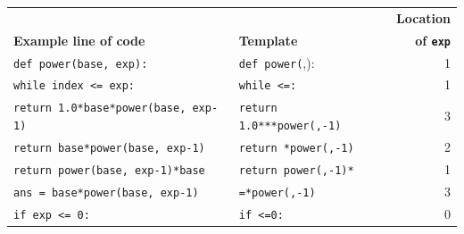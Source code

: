 \begin{table}
\centering
\begin{tabular}{l l r}
 &  & {\bf Location} \\
{\bf Example line of code} & {\bf Template} & {\bf of \texttt{exp}} \\
\hline
\footnotesize{\texttt{def power(base, exp):}} & \footnotesize{\texttt{def power(\underline{\hspace{1em}}},\underline{\hspace{1em}}):} & 1 \\
\footnotesize{\texttt{while index <= exp:}} & \footnotesize{\texttt{while \underline{\hspace{1em}}<=\underline{\hspace{1em}}:}} & 1 \\
\footnotesize{\texttt{return 1.0*base*power(base, exp-1)}} & \footnotesize{\texttt{return 1.0*\underline{\hspace{1em}}*\underline{\hspace{1em}}*power(\underline{\hspace{1em}},\underline{\hspace{1em}}-1)}} & 3 \\
\footnotesize{\texttt{return base*power(base, exp-1)}} & \footnotesize{\texttt{return \underline{\hspace{1em}}*power(\underline{\hspace{1em}},\underline{\hspace{1em}}-1)}} & 2 \\
\footnotesize{\texttt{return power(base, exp-1)*base}} & \footnotesize{\texttt{return power(\underline{\hspace{1em}},\underline{\hspace{1em}}-1)*\underline{\hspace{1em}}}} & 1 \\
\footnotesize{\texttt{ans = base*power(base, exp-1)}} & \footnotesize{\texttt{\underline{\hspace{1em}}=\underline{\hspace{1em}}*power(\underline{\hspace{1em}},\underline{\hspace{1em}}-1)}} & 3 \\
\footnotesize{\texttt{if exp <= 0:}} & \footnotesize{\texttt{if \underline{\hspace{1em}}<=0:}} & 0 \\

\end{tabular}
\end{table}
